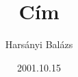 \documentclass{book}
\begin{document}
\title{Cím}
\author{Harsányi Balázs}
\date{2001.10.15}
\maketitle
\hulipsum
\end{document}
